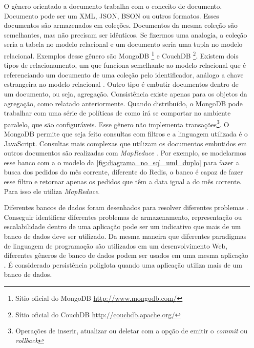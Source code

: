 O gênero orientado a documento trabalha com o conceito de documento. Documento pode ser um \ac{XML}, JSON, BSON ou outros formatos. Esses documentos são armazenados em coleções. Documentos da mesma coleção são semelhantes, mas não precisam ser idênticos. Se fizermos uma analogia, a coleção seria a tabela no modelo relacional e um documento seria uma tupla no modelo relacional. Exemplos desse gênero são MongoDB \footnote{Sítio oficial do MongoDB \url{http://www.mongodb.com/}} e CouchDB \footnote{Sítio oficial do CouchDB \url{http://couchdb.apache.org/}}\cite{NoSQL}.
Existem dois tipos de relacionamento, um que funciona semelhante ao modelo relacional que é referenciando um documento de uma coleção pelo identificador, análogo a chave estrangeira no modelo relacional . Outro tipo é embutir documentos dentro de um documento, ou seja, agregação. Consistência existe apenas para os objetos da agregação, como relatado anteriormente. Quando distribuído, o MongoDB pode trabalhar com uma série de políticas de como irá se comportar no ambiente paralelo, que são configuráveis. Esse gênero não implementa transações\footnote{Operações de inserir, atualizar ou deletar com a opção de emitir o \textit{commit} ou \textit{rollback}}. O MongoDB permite que seja feito consultas com filtros e a linguagem utilizada é o JavaScript. Consultas mais complexas que utilizam os documentos embutidos em outros documentos são realizadas com \textit{MapReduce} \cite{NoSQL}. Por exemplo, se modelarmos esse banco com a o modelo da \autoref{fig:diagrama_no_sql_uml_duplo} para fazer a busca dos pedidos do mês corrente, diferente do \ac{Redis}, o banco é capaz de fazer esse filtro e retornar apenas os pedidos que têm a data igual a do mês corrente. Para isso ele utiliza \textit{MapReduce}.

Diferentes bancos de dados foram desenhados para resolver diferentes problemas \cite{NoSQL}. Conseguir identificar diferentes problemas de armazenamento, representação ou escalabilidade dentro de uma aplicação pode ser um indicativo que mais de um banco de dados deve ser utilizado. Da mesma maneira que diferentes paradigmas de linguagem de programação são utilizados em um desenvolvimento Web, diferentes gêneros de banco de dados podem ser usados em uma mesma aplicação \cite{multiparadigma}. É considerado persistência poliglota quando uma aplicação utiliza mais de um banco de dados.


